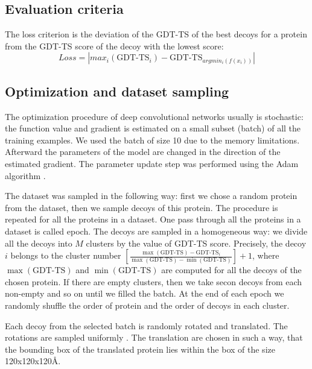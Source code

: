 \subsection{Evaluation criteria}
The loss criterion is the deviation of the GDT-TS of the best decoys for a protein from the GDT-TS score of the decoy with the lowest score:
$$ 
Loss = | max_i( \text{GDT-TS}_i ) - \text{GDT-TS}_{argmin_i(f(x_i))} |
$$ 

\subsection{Optimization and dataset sampling}
The optimization procedure of deep convolutional networks usually is stochastic: the function value and gradient 
is estimated on a small subset (batch) of all the training 
examples. We used the batch of size 10 due to the memory limitations. Afterward the parameters of the model are 
changed in the direction of the estimated gradient.
The parameter update step was performed using the Adam algorithm \cite{kingma2014adam}. 

The dataset was sampled in the following way: first we chose a random protein from the dataset, then we sample decoys of this protein. 
The procedure is repeated for all the 
proteins in a dataset. One pass through all the proteins in a dataset is called epoch. 
The decoys are sampled in a homogeneous way: we divide all the decoys into $M$ clusters by the value of GDT-TS score. 
Precisely, the decoy $i$ belongs to the cluster  
number $ \left[ \frac{\max(\text{GDT-TS}) - \text{GDT-TS}_i}{\max(\text{GDT-TS}) - \min(\text{GDT-TS})} \right] + 1$, 
where $\max(\text{GDT-TS})$ and $\min(\text{GDT-TS})$ are computed for all the decoys of 
the chosen protein. If there are empty clusters, then we take secon decoys from each non-empty and so on until we filled the batch. 
At the end of each epoch we randomly shuffle the order of protein and the order of decoys in each cluster. 

Each decoy from the selected batch is randomly rotated and translated. The rotations are sampled uniformly \cite{shoemake1992uniform}. 
The translation are chosen in such a way, that the bounding box of the translated protein lies within the box of the size 120x120x120\AA. 

